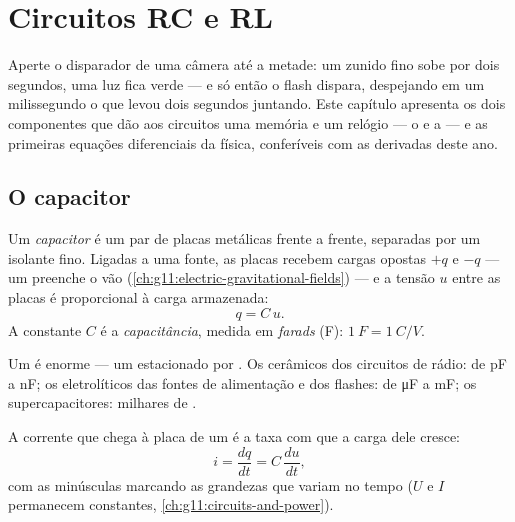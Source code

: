 \chapter{Circuitos RC e RL}\label{ch:g12:rc-rl-circuits}

Aperte o disparador de uma câmera até a metade: um zunido fino sobe por dois segundos,
uma luz fica verde --- e só então o flash dispara, despejando em um milissegundo o que
levou dois segundos juntando. Este capítulo apresenta os dois componentes que dão aos
circuitos uma memória e um relógio --- o  e a  --- e as primeiras
equações diferenciais da física, conferíveis com as derivadas deste ano.

\section{O capacitor}

\begin{definition}\label{def:g12:rc-rl-circuits:capacitor}
Um \emph{capacitor} é um par de placas metálicas frente a frente,
separadas por um isolante fino. Ligadas a uma fonte, as placas recebem cargas opostas
$+q$ e $-q$ --- um  preenche o vão
(\cref{ch:g11:electric-gravitational-fields}) --- e a tensão $u$ entre as placas é
proporcional à carga armazenada:
\[ q = C\,u . \]
A constante $C$ é a \emph{capacitância}, medida em
\emph{farads} (\unit{F}): $\qty{1}{F} = \qty{1}{C/V}$.
\end{definition}

\begin{example}\label{ex:g12:rc-rl-circuits:orders}
Um  é enorme --- um  estacionado por . Os cerâmicos dos circuitos de
rádio: de \unit{pF} a \unit{nF}; os eletrolíticos das fontes de alimentação e dos
flashes: de \unit{\micro F} a \unit{mF}; os supercapacitores: milhares de .
\end{example}

\begin{proposition}\label{prop:g12:rc-rl-circuits:cdudt}
A corrente que chega à placa de um  é a taxa com que a carga dele cresce:
\[
i = \frac{dq}{dt} = C\,\frac{du}{dt} ,
\]
com as minúsculas marcando as grandezas que variam no tempo ($U$ e $I$ permanecem
constantes, \cref{ch:g11:circuits-and-power}).
\end{proposition}

